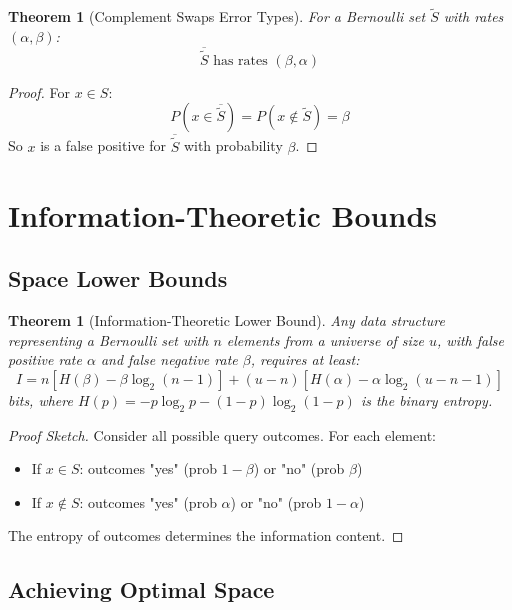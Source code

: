 \documentclass[11pt,twoside,openright]{book}
\theoremstyle{definition}
\theoremstyle{plain}
\newtheorem{theorem}[definition]{Theorem}
\theoremstyle{remark}
\begin{document}
\begin{theorem}[Complement Swaps Error Types]
For a Bernoulli set $\tilde{S}$ with rates $(\alpha, \beta)$:
\begin{equation}
\overline{\tilde{S}} \text{ has rates } (\beta, \alpha)
\end{equation}
\end{theorem}

\begin{proof}
For $x \in S$:
\begin{equation}
P(x \in \overline{\tilde{S}}) = P(x \notin \tilde{S}) = \beta
\end{equation}
So $x$ is a false positive for $\overline{\tilde{S}}$ with probability $\beta$.
\end{proof}

\section{Information-Theoretic Bounds}

\subsection{Space Lower Bounds}

\begin{theorem}[Information-Theoretic Lower Bound]
Any data structure representing a Bernoulli set with $n$ elements from a universe of size $u$, with false positive rate $\alpha$ and false negative rate $\beta$, requires at least:
\begin{equation}
I = n[H(\beta) - \beta \log_2(n-1)] + (u-n)[H(\alpha) - \alpha \log_2(u-n-1)]
\end{equation}
bits, where $H(p) = -p \log_2 p - (1-p) \log_2(1-p)$ is the binary entropy.
\end{theorem}

\begin{proof}[Proof Sketch]
Consider all possible query outcomes. For each element:
\begin{itemize}
    \item If $x \in S$: outcomes "yes" (prob $1-\beta$) or "no" (prob $\beta$)
    \item If $x \notin S$: outcomes "yes" (prob $\alpha$) or "no" (prob $1-\alpha$)
\end{itemize}
The entropy of outcomes determines the information content.
\end{proof}

\subsection{Achieving Optimal Space}
\end{document}
